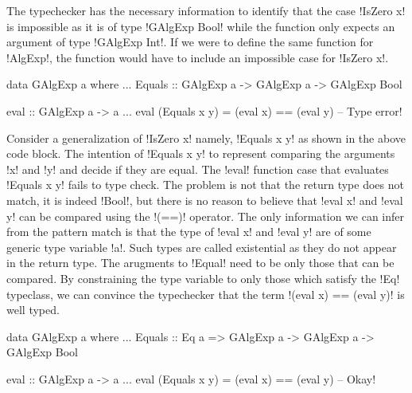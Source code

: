 \documentclass[screen,nonacm,manuscript,review]{acmart} %
\begin{document}
The typechecker has the necessary information to identify that the case
!IsZero x! is impossible as it is of type !GAlgExp Bool! while the
function only expects an argument of type !GAlgExp Int!. If we were to
define the same function for !AlgExp!, the function
would have to include an impossible case for !IsZero x!.

\begin{minipage}[ht]{0.6\linewidth}
\begin{CenteredBox}
\begin{code}
data GAlgExp a where
  ...
  Equals :: GAlgExp a -> GAlgExp a -> GAlgExp Bool
\end{code}
\end{CenteredBox}
\end{minipage}%
\begin{minipage}[ht]{0.4\linewidth}
\begin{CenteredBox}
\begin{code}
eval :: GAlgExp a -> a
...
eval (Equals x y) = (eval x) == (eval y)
                           -- Type error!
\end{code}
\end{CenteredBox}
\end{minipage}

Consider a generalization of !IsZero x! namely, !Equals x y! as shown
in the above code block. The intention of !Equals x y! to
represent comparing the arguments !x! and !y! and decide if they are
equal. The !eval! function case that evaluates !Equals x y! fails
to type check. The problem is not that the return type does not match,
it is indeed !Bool!, but there is no reason to believe that
!eval x! and !eval y! can be compared using the !(==)! operator. The
only information we can infer from the pattern match is that
the type of !eval x! and !eval y! are of some generic type variable
!a!. Such types are called existential as they do not appear in
the return type. The arugments to !Equal! need to be only those that can be compared.
By constraining the type variable to only those which satisfy
the !Eq! typeclass, we can convince the typechecker that the
term !(eval x) == (eval y)! is well typed.


\begin{minipage}[ht]{0.5\linewidth}
\begin{CenteredBox}
\begin{code}
data GAlgExp a where
...
   Equals :: Eq a => GAlgExp a -> GAlgExp a
                  -> GAlgExp Bool
\end{code}
\end{CenteredBox}
\end{minipage}%
\begin{minipage}[ht]{0.4\linewidth}
\begin{CenteredBox}
\begin{code}
eval :: GAlgExp a -> a
...
eval (Equals x y) = (eval x) == (eval y)
                              -- Okay!
\end{code}
\end{CenteredBox}
\end{minipage}
\end{document}
